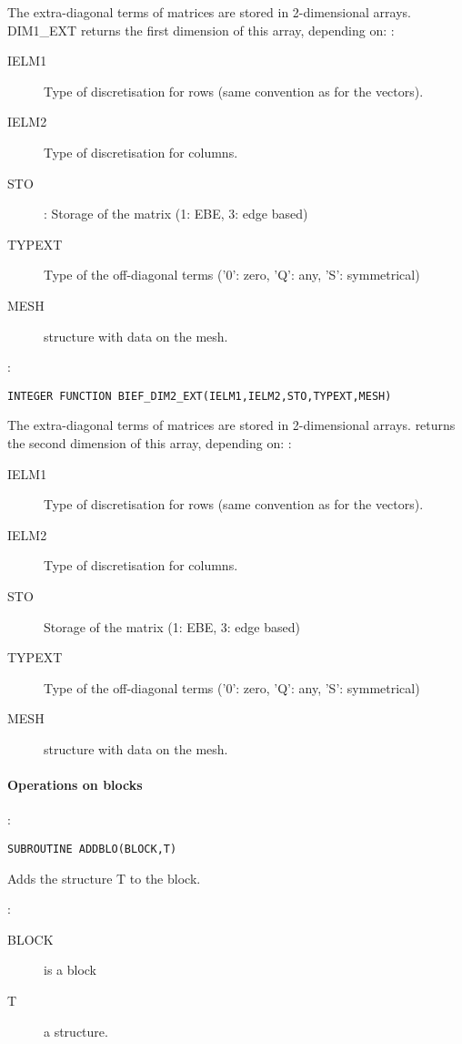 The extra-diagonal terms of matrices are stored in 2-dimensional arrays.
DIM1\_EXT returns the first dimension of this array, depending on:
:
\begin{description}
  \item [IELM1] Type of discretisation for rows (same convention as for the
    vectors).
  \item [IELM2] Type of discretisation for columns.
  \item [STO]: Storage of the matrix (1: EBE, 3: edge based)
  \item [TYPEXT] Type of the off-diagonal terms ('0': zero, 'Q': any, 'S':
    symmetrical)
  \item [MESH]  structure with data on the mesh.
\end{description}

:
\begin{lstlisting}[language=TelFortran]
INTEGER FUNCTION BIEF_DIM2_EXT(IELM1,IELM2,STO,TYPEXT,MESH)
\end{lstlisting}

The extra-diagonal terms of matrices are stored in 2-dimensional arrays.
 returns the second dimension of this array, depending on:
:
\begin{description}
  \item [IELM1] Type of discretisation for rows (same convention as for the
    vectors).
  \item [IELM2] Type of discretisation for columns.
  \item [STO] Storage of the matrix (1: EBE, 3: edge based)
  \item [TYPEXT] Type of the off-diagonal terms ('0': zero, 'Q': any, 'S':
    symmetrical)
  \item [MESH]  structure with data on the mesh.
\end{description}

\paragraph{Operations on blocks}

:
\begin{lstlisting}[language=TelFortran]
SUBROUTINE ADDBLO(BLOCK,T)
\end{lstlisting}
Adds the structure T to the block.

:
\begin{description}
  \item [BLOCK] is a block
  \item [T] a structure.
\end{description}

